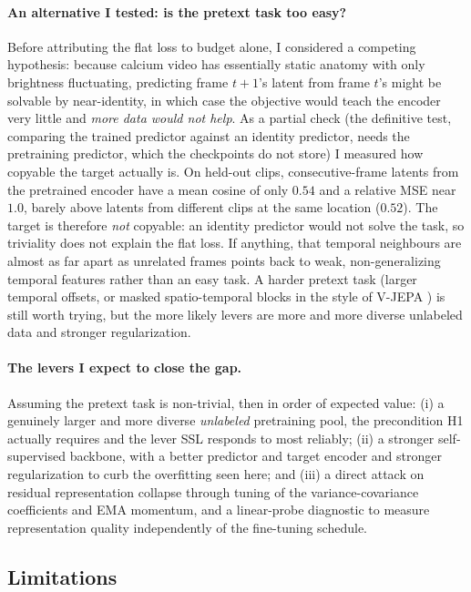 \documentclass[twoside,11pt]{article}
\begin{document}
\paragraph{An alternative I tested: is the pretext task too easy?} Before attributing the flat loss to
budget alone, I considered a competing hypothesis: because calcium video has essentially static anatomy
with only brightness fluctuating, predicting frame $t{+}1$'s latent from frame $t$'s might be solvable
by near-identity, in which case the objective would teach the encoder very little and \emph{more data
would not help}. As a partial check (the definitive test, comparing the trained predictor against an
identity predictor, needs the pretraining predictor, which the checkpoints do not store) I measured
how copyable the target actually is. On held-out clips, consecutive-frame latents from the pretrained
encoder have a mean cosine of only $0.54$ and a relative MSE near $1.0$, barely above latents from
different clips at the same location ($0.52$). The target is therefore \emph{not} copyable: an identity
predictor would not solve the task, so triviality does not explain the flat loss. If anything, that
temporal neighbours are almost as far apart as unrelated frames points back to weak, non-generalizing
temporal features rather than an easy task. A harder pretext task (larger temporal offsets, or masked
spatio-temporal blocks in the style of V-JEPA \citep{bardes2024vjepa}) is still worth trying, but the
more likely levers are more and more diverse unlabeled data and stronger regularization.

\paragraph{The levers I expect to close the gap.} Assuming the pretext task is non-trivial, then in
order of expected value: (i) a genuinely larger and more diverse \emph{unlabeled} pretraining pool,
the precondition H1 actually requires and the lever SSL responds to most reliably; (ii) a stronger
self-supervised backbone, with a better predictor and target encoder and stronger regularization to
curb the overfitting seen here; and (iii) a direct attack on residual representation collapse through tuning of
the variance-covariance coefficients and EMA momentum, and a linear-probe diagnostic to measure
representation quality independently of the fine-tuning schedule.

\subsection{Limitations}
\label{sec:limitations}
\end{document}
